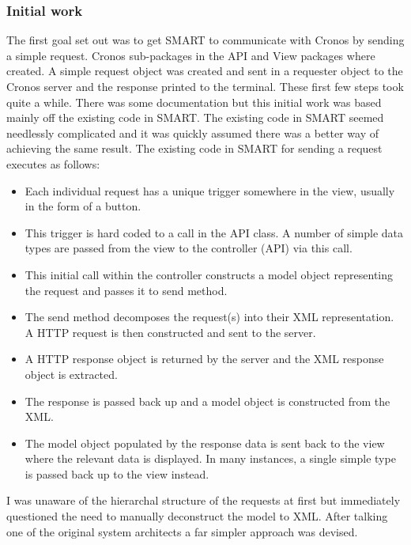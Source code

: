 \documentclass[a4paper, 11pt, titlepage]{article}
\begin{document}
\subsubsection{Initial work}
The first goal set out was to get SMART to communicate with Cronos by sending a simple request. Cronos sub-packages in the API and View packages where created. A simple request object was created and sent in a requester object to the Cronos server and the response printed to the terminal. These first few steps took quite a while. There was some documentation but this initial work was based mainly off the existing code in SMART. The existing code in SMART seemed needlessly complicated and it was quickly assumed there was a better way of achieving the same result. The existing code in SMART for sending a request executes as follows:
\begin{itemize}
\item Each individual request has a unique trigger somewhere in the view, usually in the form of a button.
\item This trigger is hard coded to a call in the API class. A number of simple data types are passed from the view to the controller (API) via this call.
\item This initial call within the controller constructs a model object representing the request and passes it to send method.
\item The send method decomposes the request(s) into their XML representation. A HTTP request is then constructed and sent to the server.
\item A HTTP response object is returned by the server and the XML response object is extracted.
\item The response is passed back up and a model object is constructed from the XML.
\item The model object populated by the response data is sent back to the view where the relevant data is displayed. In many instances, a single simple type is passed back up to the view instead.
\end{itemize}
I was unaware of the hierarchal structure of the requests at first but immediately questioned the need to manually deconstruct the model to XML. After talking one of the original system architects a far simpler approach was devised.
\end{document}
